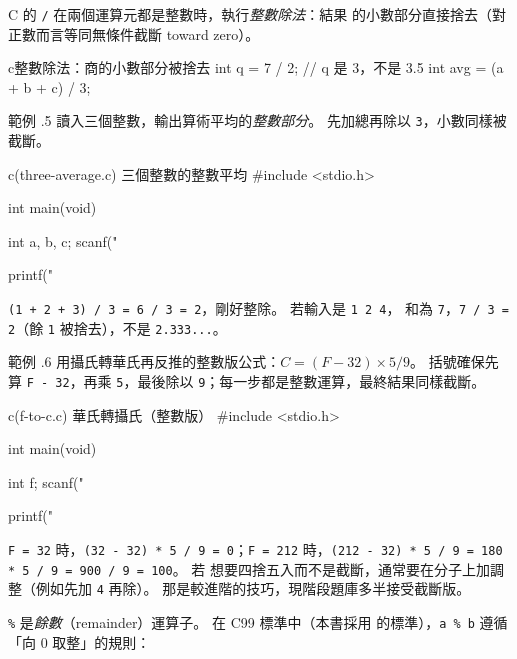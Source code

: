 C 的 \texttt{/} 在兩個運算元都是整數時，執行\emph{整數除法}：結果
的小數部分直接捨去（對正數而言等同無條件截斷 toward zero）。

\begin{code}{c}{整數除法：商的小數部分被捨去}
int q = 7 / 2;        // q 是 3，不是 3.5
int avg = (a + b + c) / 3;
\end{code}

範例 \thechapter.5 讀入三個整數，輸出算術平均的\emph{整數部分}。 
先加總再除以 \texttt{3}，小數同樣被截斷。

\begin{example}{c}{(three-average.c) 三個整數的整數平均}
#include <stdio.h>

int main(void) {
    int a, b, c;
    scanf("%

    printf("%
}
\end{example}


\texttt{(1 + 2 + 3) / 3 = 6 / 3 = 2}，剛好整除。 若輸入是 \texttt{1 2 4}，
和為 \texttt{7}，\texttt{7 / 3 = 2}（餘 \texttt{1} 被捨去），不是
\texttt{2.333...}。

範例 \thechapter.6 用攝氏轉華氏再反推的整數版公式：$C = (F - 32) \times
5 / 9$。 括號確保先算 \texttt{F - 32}，再乘 \texttt{5}，最後除以
\texttt{9}；每一步都是整數運算，最終結果同樣截斷。

\begin{example}{c}{(f-to-c.c) 華氏轉攝氏（整數版）}
#include <stdio.h>

int main(void) {
    int f;
    scanf("%

    printf("%
}
\end{example}


\texttt{F = 32} 時，\texttt{(32 - 32) * 5 / 9 = 0}；\texttt{F = 212}
時，\texttt{(212 - 32) * 5 / 9 = 180 * 5 / 9 = 900 / 9 = 100}。 若
想要四捨五入而不是截斷，通常要在分子上加調整（例如先加 \texttt{4}
再除）。 那是較進階的技巧，現階段題庫多半接受截斷版。

\texttt{\%} 是\emph{餘數}（remainder）運算子。 在 C99 標準中（本書採用
的標準），\texttt{a \% b} 遵循「向 0 取整」的規則：

